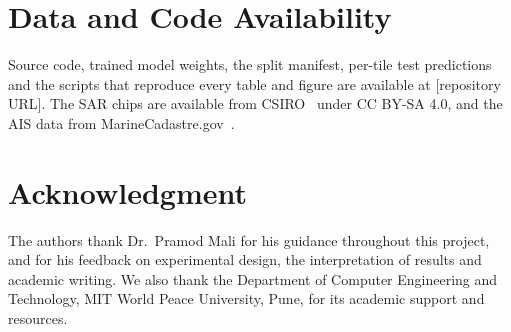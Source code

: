 \documentclass[conference]{IEEEtran}
\begin{document}
\section*{Data and Code Availability}
Source code, trained model weights, the split manifest, per-tile test predictions and the
scripts that reproduce every table and figure are available at [repository URL]. The SAR
chips are available from CSIRO~\cite{csiro2022} under CC BY-SA 4.0, and the AIS data from
MarineCadastre.gov~\cite{marinecadastre}.

\section*{Acknowledgment}
The authors thank Dr.~Pramod Mali for his guidance throughout this project, and for his
feedback on experimental design, the interpretation of results and academic writing. We
also thank the Department of Computer Engineering and Technology, MIT World Peace
University, Pune, for its academic support and resources.
\end{document}
